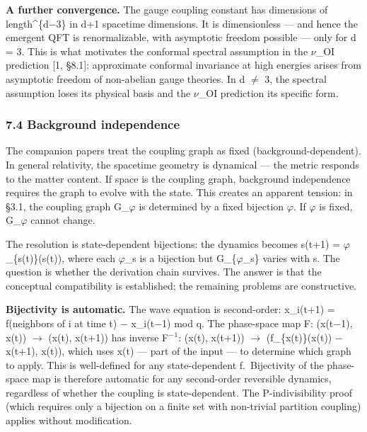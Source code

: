 \documentclass[
  11pt,
]{article}
\begin{document}
\textbf{A further convergence.} The gauge coupling constant has
dimensions of length\^{}\{d\ensuremath{-}3\} in d+1 spacetime dimensions. It is
dimensionless --- and hence the emergent QFT is renormalizable, with
asymptotic freedom possible --- only for d = 3. This is what motivates
the conformal spectral assumption in the \ensuremath{\nu}\_OI prediction {[}1, §8.1{]}:
approximate conformal invariance at high energies arises from asymptotic
freedom of non-abelian gauge theories. In d \ensuremath{\neq} 3, the spectral assumption
loses its physical basis and the \ensuremath{\nu}\_OI prediction its specific form.

\hypertarget{background-independence}{%
\subsubsection{7.4 Background
independence}\label{background-independence}}

The companion papers treat the coupling graph as fixed
(background-dependent). In general relativity, the spacetime geometry is
dynamical --- the metric responds to the matter content. If space is the
coupling graph, background independence requires the graph to evolve
with the state. This creates an apparent tension: in §3.1, the coupling
graph G\_\ensuremath{\varphi} is determined by a fixed bijection \ensuremath{\varphi}. If \ensuremath{\varphi} is fixed, G\_\ensuremath{\varphi}
cannot change.

The resolution is state-dependent bijections: the dynamics becomes
s(t+1) = \ensuremath{\varphi}\_\{s(t)\}(s(t)), where each \ensuremath{\varphi}\_s is a bijection but
G\_\{\ensuremath{\varphi}\_s\} varies with s. The question is whether the derivation chain
survives. The answer is that the conceptual compatibility is
established; the remaining problems are constructive.

\textbf{Bijectivity is automatic.} The wave equation is second-order:
x\_i(t+1) = f(neighbors of i at time t) \ensuremath{-} x\_i(t\ensuremath{-}1) mod q. The
phase-space map F: (x(t\ensuremath{-}1), x(t)) \ensuremath{\to} (x(t), x(t+1)) has inverse F\ensuremath{^{-}}\ensuremath{^1}:
(x(t), x(t+1)) \ensuremath{\to} (f\_\{x(t)\}(x(t)) \ensuremath{-} x(t+1), x(t)), which uses x(t) ---
part of the input --- to determine which graph to apply. This is
well-defined for any state-dependent f.~Bijectivity of the phase-space
map is therefore automatic for any second-order reversible dynamics,
regardless of whether the coupling is state-dependent. The
P-indivisibility proof (which requires only a bijection on a finite set
with non-trivial partition coupling) applies without modification.
\end{document}

